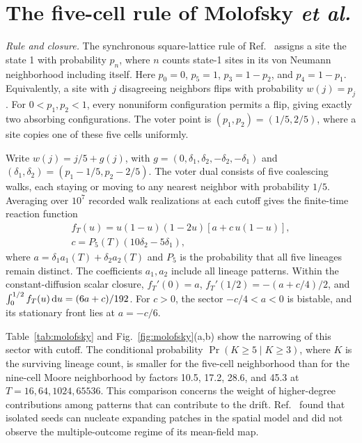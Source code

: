 \section{The five-cell rule of Molofsky \emph{et al.}}
\label{app:molofsky}

\textit{Rule and closure.} The synchronous square-lattice rule of
Ref.~\cite{molofsky1999} assigns a site the state 1 with probability $p_n$,
where $n$ counts state-1 sites in its von Neumann neighborhood including
itself. Here $p_0=0$, $p_5=1$, $p_3=1-p_2$, and $p_4=1-p_1$.
Equivalently, a site with $j$ disagreeing neighbors flips with probability
$w(j)=p_j$. For $0<p_1,p_2<1$, every nonuniform configuration permits a
flip, giving exactly two absorbing configurations. The voter point is
$(p_1,p_2)=(1/5,2/5)$, where a site copies one of these five cells uniformly.

Write $w(j)=j/5+g(j)$, with
$g=(0,\delta_1,\delta_2,-\delta_2,-\delta_1)$ and
$(\delta_1,\delta_2)=(p_1-1/5,p_2-2/5)$. The voter dual consists of five
coalescing walks, each staying or moving to any nearest neighbor with
probability $1/5$. Averaging over $10^7$ recorded walk realizations at each
cutoff gives the finite-time reaction function
\begin{equation}
 \begin{gathered}
 f_T(u)=u(1-u)(1-2u)[a+c\,u(1-u)],
 \\
 c=P_5(T)(10\delta_2-5\delta_1),
 \end{gathered}
 \label{eq:fmol}
\end{equation}
where $a=\delta_1a_1(T)+\delta_2a_2(T)$ and $P_5$ is the probability that
all five lineages remain distinct. The coefficients $a_1,a_2$ include all
lineage patterns. Within the constant-diffusion scalar closure,
$f_T'(0)=a$, $f_T'(1/2)=-(a+c/4)/2$, and
$\int_0^{1/2}f_T(u)\,\mathrm{d} u=(6a+c)/192$.
For $c>0$, the sector $-c/4<a<0$ is bistable, and its stationary front lies
at $a=-c/6$.

Table~\ref{tab:molofsky} and Fig.~\ref{fig:molofsky}(a,b) show the narrowing
of this sector with cutoff. The conditional probability
$\Pr(K\ge5\mid K\ge3)$, where $K$ is the surviving lineage count, is
smaller for the five-cell neighborhood than for the nine-cell Moore
neighborhood by factors 10.5, 17.2, 28.6, and 45.3 at
$T=16,64,1024,65536$. This comparison concerns the weight of higher-degree
contributions among patterns that can contribute to the drift. Ref.~\cite{molofsky1999}
found that isolated seeds can nucleate expanding patches in the spatial
model and did not observe the multiple-outcome regime of its mean-field map.

